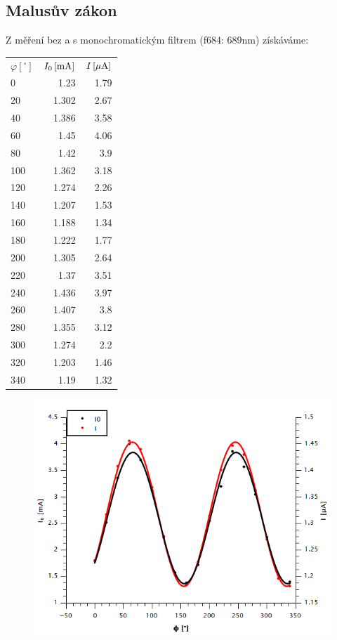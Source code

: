 \documentclass[czech,11pt,a4paper]{article}
\begin{document}
\begin{multicols}{2}
\begin{center}
	\subsection{Malusův zákon}
	Z měření bez a s monochromatickým filtrem (f684: 689nm) získáváme: \\
	\begin{tabular}{l|rr}
		$\varphi [^\circ]$ & $I_0 \,\rm[mA]$ & $I\,\rm [\mu A]$ \\
		0               & 1.23            & 1.79              \\
		20              & 1.302           & 2.67              \\
		40              & 1.386           & 3.58              \\
		60              & 1.45            & 4.06              \\
		80              & 1.42            & 3.9               \\
		100             & 1.362           & 3.18              \\
		120             & 1.274           & 2.26              \\
		140             & 1.207           & 1.53              \\
		160             & 1.188           & 1.34              \\
		180             & 1.222           & 1.77              \\
		200             & 1.305           & 2.64              \\
		220             & 1.37            & 3.51              \\
		240             & 1.436           & 3.97              \\
		260             & 1.407           & 3.8               \\
		280             & 1.355           & 3.12              \\
		300             & 1.274           & 2.2               \\
		320             & 1.203           & 1.46              \\
		340             & 1.19            & 1.32             
	\end{tabular}
	\begin{figure}[H]
		\includegraphics[width = 0.95\linewidth, center]{zavislost}

\end{figure}
\end{center}
\end{multicols}
\end{document}
